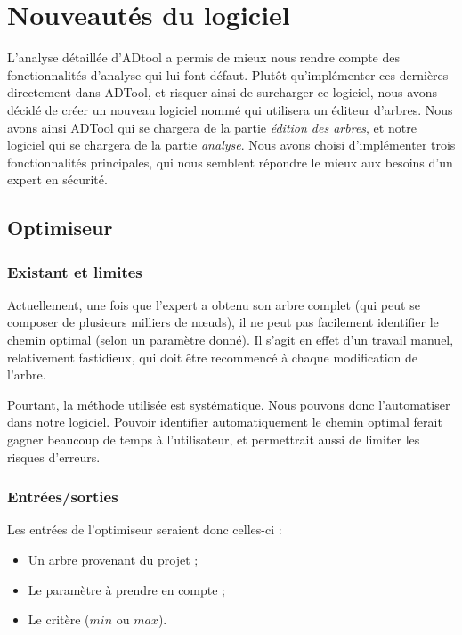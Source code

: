 \section{Nouveautés du logiciel}

	L'analyse détaillée d'ADtool a permis de mieux nous rendre compte des fonctionnalités d'analyse qui lui font défaut. Plutôt qu'implémenter ces dernières directement dans ADTool, et risquer ainsi de surcharger %
	ce logiciel, nous avons décidé de créer un nouveau logiciel nommé \glasir qui utilisera un éditeur d'arbres. Nous avons ainsi ADTool qui se chargera de la partie \textit{édition des arbres}, et notre logiciel qui se chargera de la partie \textit{analyse}. Nous avons choisi d'implémenter trois fonctionnalités principales, qui nous semblent répondre le mieux aux besoins d'un expert en sécurité.

		\subsection{Optimiseur}
		\label{subsection:optimiseur}
			\subsubsection{Existant et limites}
		Actuellement, une fois que l'expert a obtenu son arbre complet (qui peut se composer de plusieurs milliers de nœuds), il ne peut pas facilement identifier le chemin optimal (selon un paramètre donné).
		Il s'agit en effet d'un travail manuel, relativement fastidieux, qui doit être recommencé à chaque modification de l'arbre.
		
		Pourtant, la méthode utilisée est systématique. Nous pouvons donc l'automatiser dans notre logiciel. Pouvoir identifier automatiquement le chemin optimal ferait gagner beaucoup de temps à l'utilisateur, et permettrait aussi de limiter les risques d'erreurs.

			\subsubsection{Entrées/sorties}
		Les entrées de l'optimiseur seraient donc celles-ci :
		\begin{itemize}
			\item Un arbre provenant du projet ;
			\item Le paramètre à prendre en compte ;
			\item Le critère ($min$ ou $max$).
		\end{itemize}


